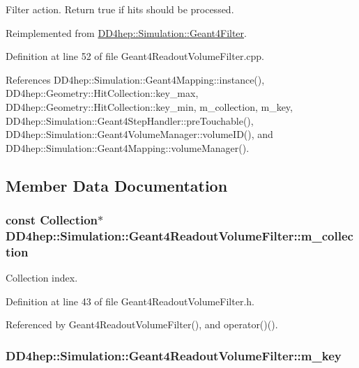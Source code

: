 Filter action. Return true if hits should be processed. 

Reimplemented from \hyperlink{class_d_d4hep_1_1_simulation_1_1_geant4_filter_afff6fafea1b7c0c7d61834ae0a51a23f}{DD4hep::Simulation::Geant4Filter}.

Definition at line 52 of file Geant4ReadoutVolumeFilter.cpp.

References DD4hep::Simulation::Geant4Mapping::instance(), DD4hep::Geometry::HitCollection::key\_\-max, DD4hep::Geometry::HitCollection::key\_\-min, m\_\-collection, m\_\-key, DD4hep::Simulation::Geant4StepHandler::preTouchable(), DD4hep::Simulation::Geant4VolumeManager::volumeID(), and DD4hep::Simulation::Geant4Mapping::volumeManager().

\subsection{Member Data Documentation}
\hypertarget{class_d_d4hep_1_1_simulation_1_1_geant4_readout_volume_filter_ab38d8bb4c3c84b5e71af194dc2e9c060}{
\subsubsection[{m\_\-collection}]{\setlength{\rightskip}{0pt plus 5cm}const {\bf Collection}$\ast$ {\bf DD4hep::Simulation::Geant4ReadoutVolumeFilter::m\_\-collection}}}
\label{class_d_d4hep_1_1_simulation_1_1_geant4_readout_volume_filter_ab38d8bb4c3c84b5e71af194dc2e9c060}


Collection index. 

Definition at line 43 of file Geant4ReadoutVolumeFilter.h.

Referenced by Geant4ReadoutVolumeFilter(), and operator()().\hypertarget{class_d_d4hep_1_1_simulation_1_1_geant4_readout_volume_filter_a56f36107494374152415b45a635d4030}{
\subsubsection[{m\_\-key}]{ {\bf DD4hep::Simulation::Geant4ReadoutVolumeFilter::m\_\-key}}}
\label{class_d_d4hep_1_1_simulation_1_1_geant4_readout_volume_filter_a56f36107494374152415b45a635d4030}


